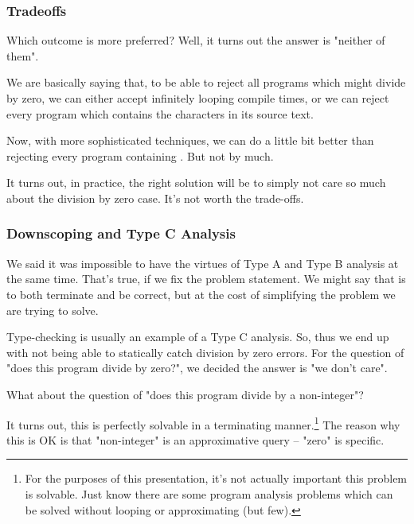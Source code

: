 \documentclass[aspectratio=169, handout]{beamer}
\begin{document}
\begin{frame}[fragile]
  \frametitle{Tradeoffs}

  Which outcome is more preferred? Well, it turns out the answer is
  "neither of them".

  \pause
  \vspace{\fill}

  We are basically saying that, to be able to reject all programs which might
  divide by zero, we can either accept infinitely looping compile times, or we
  can reject every program which contains the characters  in its
  source text.

  \pause
  \vspace{\fill}

  Now, with more sophisticated techniques, we can do a little bit better than
  rejecting every program containing . But not by much.

  \pause
  \vspace{\fill}

  It turns out, in practice, the right solution will be to simply not
  care so much about the division by zero case. It's not worth the
  trade-offs.
\end{frame}

\begin{frame}[fragile]
  \frametitle{Downscoping and Type C Analysis}

  We said it was impossible to have the virtues of Type A and Type B analysis at the
  same time. That's true, if we fix the problem statement. We might say that
   is to both terminate and be correct, but at the cost of
  simplifying the problem we are trying to solve.

  \pause
  \vspace{\fill}

  Type-checking is usually an example of a Type C analysis. So, thus we end up
  with not being able to statically catch division by zero errors. For the
  question of "does this program divide by zero?", we decided the answer is "we
  don't care".

  \pause
  \vspace{\fill}

  What about the question of "does this program divide by a non-integer"?

  \pause
  \vspace{\fill}

  It turns out, this is perfectly solvable in a terminating manner.\footnote{For the
  purposes of this presentation, it's not actually important this problem is solvable.
  Just know there are some program analysis problems which can be solved without
  looping or approximating (but few).} The
  reason why this is OK is that "non-integer" is an approximative query --
  "zero" is specific.
\end{frame}
\end{document}
